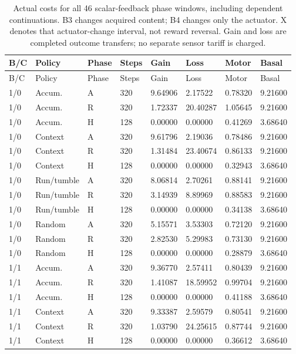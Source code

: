 \begin{longtable}{llllllll}
\caption{Actual costs for all 46 scalar-feedback phase windows, including dependent continuations. B3 changes acquired content; B4 changes only the actuator. X denotes that actuator-change interval, not reward reversal. Gain and loss are completed outcome transfers; no separate sensor tariff is charged.}\label{tab:scalar-costs}\\
\toprule
B/C & Policy & Phase & Steps & Gain & Loss & Motor & Basal \\
\midrule
\endfirsthead
\toprule
B/C & Policy & Phase & Steps & Gain & Loss & Motor & Basal \\
\midrule
\endhead
1/0 & Accum. & A & 320 & 9.64906 & 2.17522 & 0.78320 & 9.21600 \\
1/0 & Accum. & R & 320 & 1.72337 & 20.40287 & 1.05645 & 9.21600 \\
1/0 & Accum. & H & 128 & 0.00000 & 0.00000 & 0.41269 & 3.68640 \\
1/0 & Context & A & 320 & 9.61796 & 2.19036 & 0.78486 & 9.21600 \\
1/0 & Context & R & 320 & 1.31484 & 23.40674 & 0.86133 & 9.21600 \\
1/0 & Context & H & 128 & 0.00000 & 0.00000 & 0.32943 & 3.68640 \\
1/0 & Run/tumble & A & 320 & 8.06814 & 2.70261 & 0.88141 & 9.21600 \\
1/0 & Run/tumble & R & 320 & 3.14939 & 8.89969 & 0.88583 & 9.21600 \\
1/0 & Run/tumble & H & 128 & 0.00000 & 0.00000 & 0.34138 & 3.68640 \\
1/0 & Random & A & 320 & 5.15571 & 3.53303 & 0.72120 & 9.21600 \\
1/0 & Random & R & 320 & 2.82530 & 5.29983 & 0.73130 & 9.21600 \\
1/0 & Random & H & 128 & 0.00000 & 0.00000 & 0.28879 & 3.68640 \\
1/1 & Accum. & A & 320 & 9.36770 & 2.57411 & 0.80439 & 9.21600 \\
1/1 & Accum. & R & 320 & 1.41087 & 18.59952 & 0.99704 & 9.21600 \\
1/1 & Accum. & H & 128 & 0.00000 & 0.00000 & 0.41188 & 3.68640 \\
1/1 & Context & A & 320 & 9.33387 & 2.59579 & 0.80541 & 9.21600 \\
1/1 & Context & R & 320 & 1.03790 & 24.25615 & 0.87744 & 9.21600 \\
1/1 & Context & H & 128 & 0.00000 & 0.00000 & 0.36612 & 3.68640 \\

\end{longtable}
